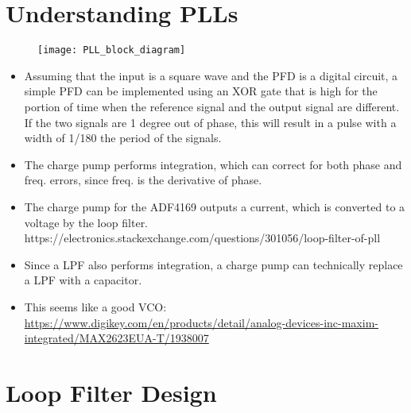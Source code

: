 \documentclass[12pt, letterpaper]{article}
\begin{document}
\section{Understanding PLLs}

\begin{figure}[h]
    \texttt{[image: PLL\_block\_diagram]}
\end{figure}

\begin{itemize}
    \item Assuming that the input is a square wave and the PFD is a digital circuit, a simple PFD can be implemented using an XOR gate that is high for the portion of time when the reference signal and the output signal are different. If the two signals are 1 degree out of phase, this will result in a pulse with a width of 1/180 the period of the signals.
    \item The charge pump performs integration, which can correct for both phase and freq. errors, since freq. is the derivative of phase.
    \item The charge pump for the ADF4169 outputs a current, which is converted to a voltage by the loop filter. https://electronics.stackexchange.com/questions/301056/loop-filter-of-pll
    \item Since a LPF also performs integration, a charge pump can technically replace a LPF with a capacitor.
    \item This seems like a good VCO: \url{https://www.digikey.com/en/products/detail/analog-devices-inc-maxim-integrated/MAX2623EUA-T/1938007}
\end{itemize}

\section{Loop Filter Design}
\end{document}
